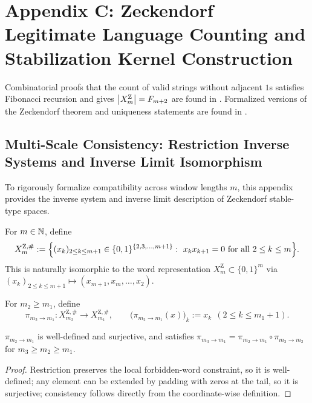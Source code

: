 \section{Appendix C: Zeckendorf Legitimate Language Counting and Stabilization Kernel Construction}
\label{app:zeckendorf-fold}

Combinatorial proofs that the count of valid strings without adjacent $1$s satisfies Fibonacci recursion and gives $\left\lvert X_m^{\mathrm Z}\right\rvert=F_{m+2}$ are found in \cite{PlanetMathZeckendorfCombinatorial}.
Formalized versions of the Zeckendorf theorem and uniqueness statements are found in \cite{AFPZeckendorf}.

\subsection{Multi-Scale Consistency: Restriction Inverse Systems and Inverse Limit Isomorphism}

To rigorously formalize compatibility across window lengths $m$, this appendix provides the inverse system and inverse limit description of Zeckendorf stable-type spaces.

\begin{definition}\label{def:app-XmZ-indexed}
For $m\in\mathbb{N}$, define
\[
X_m^{\mathrm Z,\#}:=\Bigl\{(x_k)_{2\le k\le m+1}\in\{0,1\}^{\{2,3,\dots,m+1\}}:\ x_kx_{k+1}=0\ \text{for all}\ 2\le k\le m\Bigr\}.
\]
This is naturally isomorphic to the word representation $X_m^{\mathrm Z}\subset\{0,1\}^m$ via $(x_k)_{2\le k\le m+1}\mapsto (x_{m+1},x_m,\dots,x_2)$.
\end{definition}

\begin{definition}\label{def:app-pi}
For $m_2\ge m_1$, define
\[
\pi_{m_2\to m_1}:X_{m_2}^{\mathrm Z,\#}\to X_{m_1}^{\mathrm Z,\#},\qquad
\bigl(\pi_{m_2\to m_1}(x)\bigr)_k:=x_k\ \ (2\le k\le m_1+1).
\]
\end{definition}

\begin{lemma}\label{lem:app-pi-basic}
$\pi_{m_2\to m_1}$ is well-defined and surjective, and satisfies $\pi_{m_3\to m_1}=\pi_{m_2\to m_1}\circ \pi_{m_3\to m_2}$ for $m_3\ge m_2\ge m_1$.
\end{lemma}

\begin{proof}
Restriction preserves the local forbidden-word constraint, so it is well-defined; any element can be extended by padding with zeros at the tail, so it is surjective; consistency follows directly from the coordinate-wise definition.
\end{proof}

